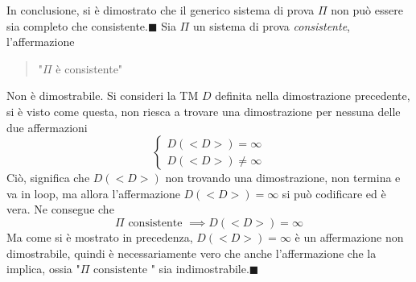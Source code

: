 \documentclass[10pt, letterpaper]{report}
\begin{document}
In conclusione, si è dimostrato che il generico sistema di prova $\Pi$ non può essere sia completo che consistente.\hfill$\blacksquare$\acc 
{} Sia $\Pi$ un sistema di prova \textit{consistente}, l'affermazione \begin{quote}
    "$\Pi$ è consistente"
\end{quote}
Non è dimostrabile. \acc 
\dimo{} Si consideri la TM $D$ definita nella dimostrazione precedente, si è visto come questa, non riesca a trovare una dimostrazione per nessuna delle due affermazioni 
$$ \begin{cases}
    D(<D>)=\infty\\ 
    D(<D>)\ne \infty
\end{cases}$$
Ciò, significa che $D(<D>)$ non trovando una dimostrazione, non termina e va in loop, ma allora l'affermazione $D(<D>)=\infty$ si può codificare ed è vera. Ne consegue che 
$$ \Pi \text{ consistente }\implies D(<D>)=\infty$$
Ma come si è mostrato in precedenza, $D(<D>)=\infty$ è un affermazione non dimostrabile, quindi è necessariamente vero che anche l'affermazione che la implica, ossia "$\Pi \text{ consistente }$" sia indimostrabile.\hfill$\blacksquare$
\end{document}
